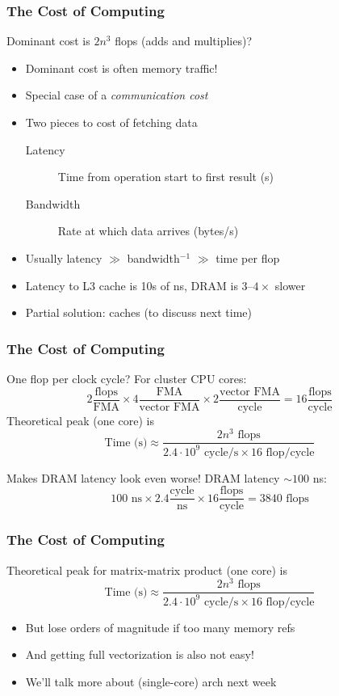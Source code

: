 \documentclass{beamer}
\begin{document}
\begin{frame}
  \frametitle{The Cost of Computing}

  Dominant cost is $2n^3$ flops (adds and multiplies)?
  \begin{itemize}
  \item Dominant cost is often memory traffic!
  \item Special case of a {\em communication cost}
  \item Two pieces to cost of fetching data
    \begin{description}
    \item[Latency] Time from operation start to first result (s)
    \item[Bandwidth] Rate at which data arrives (bytes/s)
    \end{description}
  \item Usually latency $\gg$ bandwidth$^{-1}$ $\gg$ time per flop
  \item Latency to L3 cache is 10s of ns, DRAM is $3$--$4 \times$
    slower
  \item Partial solution: caches (to discuss next time)
  \end{itemize}
\end{frame}


\begin{frame}
  \frametitle{The Cost of Computing}
  
  One flop per clock cycle? For cluster CPU cores:
  \[
  2 \frac{\mbox{flops}}{\mbox{FMA}} \times
  4 \frac{\mbox{FMA}}{\mbox{vector FMA}} \times
  2 \frac{\mbox{vector FMA}}{\mbox{cycle}} =
  16 \frac{\mbox{flops}}{\mbox{cycle}}
  \]
  Theoretical peak (one core) is
  \[
  \mbox{Time (s)} \approx
  \frac{2n^3 \mbox{ flops}}
       {2.4 \cdot 10^9 \mbox{ cycle/s} \times 16 \mbox{ flop/cycle}}
  \]

  \vspace{5mm}
  Makes DRAM latency look even worse!
  DRAM latency $\sim 100$ ns:
  \[
  100 \mbox{ ns} \times
  2.4 \frac{\mbox{cycle}}{\mbox{ns}} \times
  16 \frac{\mbox{flops}}{\mbox{cycle}} =
  3840 \mbox{ flops}
  \]

\end{frame}


\begin{frame}
  \frametitle{The Cost of Computing}

  Theoretical peak for matrix-matrix product (one core) is
  \[
    \mbox{Time (s)} \approx
    \frac{2n^3 \mbox{ flops}}
         {2.4 \cdot 10^9 \mbox{ cycle/s} \times 16 \mbox{ flop/cycle}}
  \]
  \begin{itemize}
  \item But lose orders of magnitude if too many memory refs
  \item And getting full vectorization is also not easy!
  \item We'll talk more about (single-core) arch next week
  \end{itemize}

\end{frame}
\end{document}
